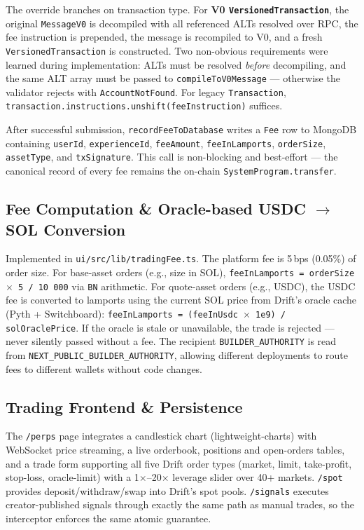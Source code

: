 \documentclass[11pt,a4paper]{article}
\begin{document}
The override branches on transaction type. For \textbf{V0 \texttt{VersionedTransaction}}, the original \texttt{MessageV0} is decompiled with all referenced ALTs resolved over RPC, the fee instruction is prepended, the message is recompiled to V0, and a fresh \texttt{VersionedTransaction} is constructed. Two non-obvious requirements were learned during implementation: ALTs must be resolved \textit{before} decompiling, and the same ALT array must be passed to \texttt{compileToV0Message} --- otherwise the validator rejects with \texttt{AccountNotFound}. For legacy \texttt{Transaction}, \texttt{transaction.instructions.unshift(feeInstruction)} suffices.

After successful submission, \texttt{recordFeeToDatabase} writes a \texttt{Fee} row to MongoDB containing \texttt{userId}, \texttt{experienceId}, \texttt{feeAmount}, \texttt{feeInLamports}, \texttt{orderSize}, \texttt{assetType}, and \texttt{txSignature}. This call is non-blocking and best-effort --- the canonical record of every fee remains the on-chain \texttt{SystemProgram.transfer}.

\subsection{Fee Computation \& Oracle-based USDC \texorpdfstring{$\rightarrow$}{->} SOL Conversion}

Implemented in \texttt{ui/src/lib/tradingFee.ts}. The platform fee is 5\,bps (0.05\%) of order size. For base-asset orders (e.g., size in SOL), \texttt{feeInLamports = orderSize $\times$ 5 / 10\,000} via \texttt{BN} arithmetic. For quote-asset orders (e.g., USDC), the USDC fee is converted to lamports using the current SOL price from Drift's oracle cache (Pyth + Switchboard): \texttt{feeInLamports = (feeInUsdc $\times$ 1e9) / solOraclePrice}. If the oracle is stale or unavailable, the trade is rejected --- never silently passed without a fee. The recipient \texttt{BUILDER\_AUTHORITY} is read from \texttt{NEXT\_PUBLIC\_BUILDER\_AUTHORITY}, allowing different deployments to route fees to different wallets without code changes.

\subsection{Trading Frontend \& Persistence}

The \texttt{/perps} page integrates a candlestick chart (lightweight-charts) with WebSocket price streaming, a live orderbook, positions and open-orders tables, and a trade form supporting all five Drift order types (market, limit, take-profit, stop-loss, oracle-limit) with a 1$\times$--20$\times$ leverage slider over 40+ markets. \texttt{/spot} provides deposit/withdraw/swap into Drift's spot pools. \texttt{/signals} executes creator-published signals through exactly the same path as manual trades, so the interceptor enforces the same atomic guarantee.
\end{document}

